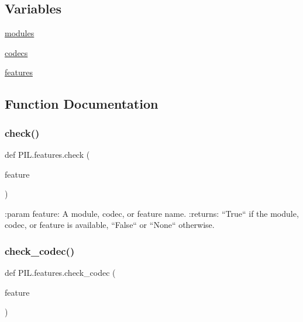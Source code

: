 \subsection*{Variables}
\begin{DoxyCompactItemize}
\item 
\hyperlink{namespacePIL_1_1features_a830cab01c2c555e90ffe1986646609d0}{modules}
\item 
\hyperlink{namespacePIL_1_1features_a7a095b9622e9a683d6077402910bb638}{codecs}
\item 
\hyperlink{namespacePIL_1_1features_ac781694a3f6fd5be1670197ebf8d7800}{features}
\end{DoxyCompactItemize}


\subsection{Function Documentation}
\mbox{\label{namespacePIL_1_1features_a72161dd073e2e79538e58ce554a9dae5}} 
\subsubsection{\texorpdfstring{check()}{check()}}
{\footnotesize\ttfamily def P\+I\+L.\+features.\+check (\begin{DoxyParamCaption}\item[{}]{feature }\end{DoxyParamCaption})}

\begin{DoxyVerb}:param feature: A module, codec, or feature name.
:returns:
    ``True`` if the module, codec, or feature is available,
    ``False`` or ``None`` otherwise.
\end{DoxyVerb}
 \mbox{\label{namespacePIL_1_1features_aec3de1af903a33b7eb2578a70b2a9411}} 
\subsubsection{\texorpdfstring{check\+\_\+codec()}{check\_codec()}}
{\footnotesize\ttfamily def P\+I\+L.\+features.\+check\+\_\+codec (\begin{DoxyParamCaption}\item[{}]{feature }\end{DoxyParamCaption})}

